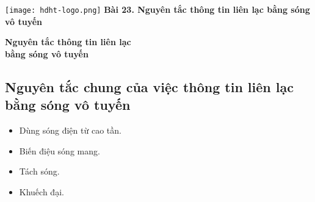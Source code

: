 \newcommand{\chapter}[2][]{
	\newcommand{\chapname}{#2}
	\begin{flushleft}
		\begin{minipage}[t]{\linewidth}
			\texttt{[image: hdht-logo.png]}
			\hspace{0pt}	
			\sffamily\bfseries\large Bài  23. Nguyên tắc thông tin liên lạc bằng sóng vô tuyến
			\begin{flushleft}
				\huge\bfseries #1
			\end{flushleft}
		\end{minipage}
	\end{flushleft}
	\vspace{1cm}
	\normalfont\normalsize
}
\chapter[Nguyên tắc thông tin liên lạc\\ bằng sóng vô tuyến]{Nguyên tắc thông tin liên lạc bằng sóng vô tuyến}

	\subsection {Nguyên tắc chung của việc thông tin liên lạc bằng sóng vô tuyến}
\begin{itemize}
	\item Dùng sóng điện từ cao tần.
	\item Biến điệu sóng mang.
	\item Tách sóng.
	\item Khuếch đại.
\end{itemize}
